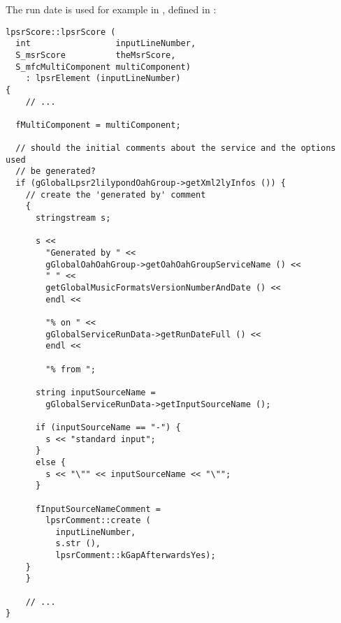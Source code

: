 The run date is used for example in , defined in :%
\begin{lstlisting}[language=CPlusPlus]
lpsrScore::lpsrScore (
  int                 inputLineNumber,
  S_msrScore          theMsrScore,
  S_mfcMultiComponent multiComponent)
    : lpsrElement (inputLineNumber)
{
	// ...

  fMultiComponent = multiComponent;

  // should the initial comments about the service and the options used
  // be generated?
  if (gGlobalLpsr2lilypondOahGroup->getXml2lyInfos ()) {
    // create the 'generated by' comment
    {
      stringstream s;

      s <<
        "Generated by " <<
        gGlobalOahOahGroup->getOahOahGroupServiceName () <<
        " " <<
        getGlobalMusicFormatsVersionNumberAndDate () <<
        endl <<

        "% on " <<
        gGlobalServiceRunData->getRunDateFull () <<
        endl <<

        "% from ";

      string inputSourceName =
        gGlobalServiceRunData->getInputSourceName ();

      if (inputSourceName == "-") {
        s << "standard input";
      }
      else {
        s << "\"" << inputSourceName << "\"";
      }

      fInputSourceNameComment =
        lpsrComment::create (
          inputLineNumber,
          s.str (),
          lpsrComment::kGapAfterwardsYes);
    }
	}

	// ...
}
\end{lstlisting}

